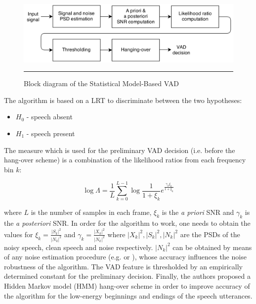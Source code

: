 \begin{figure}[htbp]
	\centering
		\includegraphics[width=0.9\columnwidth]{Figures/Chapter2/Sohn.png}
		\rule{37em}{0.5pt}
	\caption[Block diagram of the Statistical Model-Based VAD]{Block diagram of the Statistical Model-Based VAD \cite{Sohn}}
	\label{fig:Sohn}
\end{figure}

The algorithm is based on a LRT to discriminate between the two hypotheses:
\begin{itemize}
\item[] $H_0$ - speech absent
\item[] $H_1$ - speech present
\end{itemize}

The measure which is used for the preliminary VAD decision (i.e. before the hang-over scheme) is a combination of the likelihood ratios from each frequency bin $k$:

\begin{equation}
\log \Lambda = \frac{1}{L} \sum_{k=0}^{L-1} \log \frac{1}{1+\xi_k} e^{\frac{\gamma_k\xi_k}{1+\xi_k}}
\end{equation}

where $L$ is the number of samples in each frame, $\xi_k$ is the \emph{a priori} SNR and $\gamma_k$ is the \emph{a posteriori} SNR. In order for the algorithm to work, one needs to obtain the values for $\xi_k = \frac{\left | S_k \right |^{2}}{\left | N_k \right |^{2}}$ and $\gamma_k = \frac{\left | X_k \right |^{2}}{\left | N_k \right |^{2}}$ where $\left | X_k \right |^{2}, \left | S_k \right |^{2}, \left | N_k \right |^{2}$ are the PSDs of the noisy speech, clean speech and noise respectively. $\left | N_k \right |^{2}$ can be obtained by means of any noise estimation procedure (e.g. \cite{MSnoise} or \cite{MMSEnoise}), whose accuracy influences the noise robustness of the algorithm. The VAD feature is thresholded by an empirically determined constant for the preliminary decision. Finally, the authors proposed a Hidden Markov model (HMM) hang-over scheme in order to improve accuracy of the algorithm for the low-energy beginnings and endings of the speech utterances.

